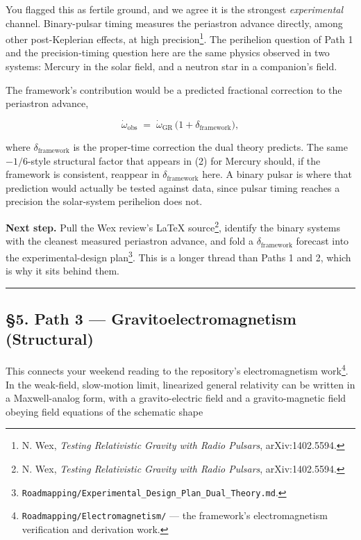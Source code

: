 \documentclass[
  11pt,
]{article}
\begin{document}
You flagged this as fertile ground, and we agree it is the strongest
\emph{experimental} channel. Binary-pulsar timing measures the
periastron advance directly, among other post-Keplerian effects, at high
precision\footnote{N. Wex, \emph{Testing Relativistic Gravity with Radio
  Pulsars}, arXiv:1402.5594.}. The perihelion question of Path 1 and the
precision-timing question here are the same physics observed in two
systems: Mercury in the solar field, and a neutron star in a companion's
field.

The framework's contribution would be a predicted fractional correction
to the periastron advance,

\[
\dot{\omega}_{\text{obs}} \;=\; \dot{\omega}_{\text{GR}}\,\bigl(1 + \delta_{\text{framework}}\bigr), \tag{3}
\]

where \(\delta_{\text{framework}}\) is the proper-time correction the
dual theory predicts. The same \(-1/6\)-style structural factor that
appears in (2) for Mercury should, if the framework is consistent,
reappear in \(\delta_{\text{framework}}\) here. A binary pulsar is where
that prediction would actually be tested against data, since pulsar
timing reaches a precision the solar-system perihelion does not.

\textbf{Next step.} Pull the Wex review's LaTeX source\footnote{N. Wex,
  \emph{Testing Relativistic Gravity with Radio Pulsars},
  arXiv:1402.5594.}, identify the binary systems with the cleanest
measured periastron advance, and fold a \(\delta_{\text{framework}}\)
forecast into the experimental-design plan\footnote{\texttt{Roadmapping/Experimental\_Design\_Plan\_Dual\_Theory.md}.}.
This is a longer thread than Paths 1 and 2, which is why it sits behind
them.

\begin{center}\rule{0.5\linewidth}{0.5pt}\end{center}

\hypertarget{path-3-gravitoelectromagnetism-structural}{%
\subsection{§5. Path 3 --- Gravitoelectromagnetism
(Structural)}\label{path-3-gravitoelectromagnetism-structural}}

This connects your weekend reading to the repository's electromagnetism
work\footnote{\texttt{Roadmapping/Electromagnetism/} --- the framework's
  electromagnetism verification and derivation work.}. In the
weak-field, slow-motion limit, linearized general relativity can be
written in a Maxwell-analog form, with a gravito-electric field and a
gravito-magnetic field obeying field equations of the schematic shape
\end{document}
